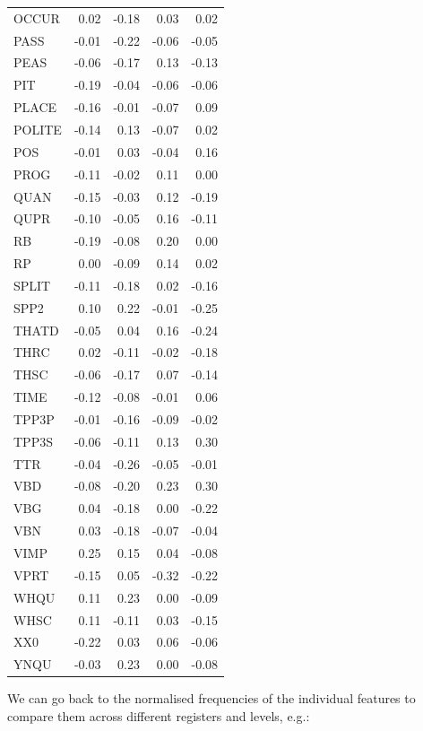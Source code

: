 \documentclass[
  letterpaper,
  DIV=11,
  numbers=noendperiod]{scrreprt}
\begin{document}
\begin{longtable}[]{@{}lrrrr@{}}
OCCUR & 0.02 & -0.18 & 0.03 & 0.02 \\
PASS & -0.01 & -0.22 & -0.06 & -0.05 \\
PEAS & -0.06 & -0.17 & 0.13 & -0.13 \\
PIT & -0.19 & -0.04 & -0.06 & -0.06 \\
PLACE & -0.16 & -0.01 & -0.07 & 0.09 \\
POLITE & -0.14 & 0.13 & -0.07 & 0.02 \\
POS & -0.01 & 0.03 & -0.04 & 0.16 \\
PROG & -0.11 & -0.02 & 0.11 & 0.00 \\
QUAN & -0.15 & -0.03 & 0.12 & -0.19 \\
QUPR & -0.10 & -0.05 & 0.16 & -0.11 \\
RB & -0.19 & -0.08 & 0.20 & 0.00 \\
RP & 0.00 & -0.09 & 0.14 & 0.02 \\
SPLIT & -0.11 & -0.18 & 0.02 & -0.16 \\
SPP2 & 0.10 & 0.22 & -0.01 & -0.25 \\
THATD & -0.05 & 0.04 & 0.16 & -0.24 \\
THRC & 0.02 & -0.11 & -0.02 & -0.18 \\
THSC & -0.06 & -0.17 & 0.07 & -0.14 \\
TIME & -0.12 & -0.08 & -0.01 & 0.06 \\
TPP3P & -0.01 & -0.16 & -0.09 & -0.02 \\
TPP3S & -0.06 & -0.11 & 0.13 & 0.30 \\
TTR & -0.04 & -0.26 & -0.05 & -0.01 \\
VBD & -0.08 & -0.20 & 0.23 & 0.30 \\
VBG & 0.04 & -0.18 & 0.00 & -0.22 \\
VBN & 0.03 & -0.18 & -0.07 & -0.04 \\
VIMP & 0.25 & 0.15 & 0.04 & -0.08 \\
VPRT & -0.15 & 0.05 & -0.32 & -0.22 \\
WHQU & 0.11 & 0.23 & 0.00 & -0.09 \\
WHSC & 0.11 & -0.11 & 0.03 & -0.15 \\
XX0 & -0.22 & 0.03 & 0.06 & -0.06 \\
YNQU & -0.03 & 0.23 & 0.00 & -0.08 \\
\end{longtable}

We can go back to the normalised frequencies of the individual features
to compare them across different registers and levels, e.g.:
\end{document}
